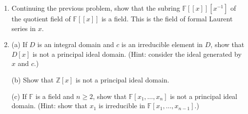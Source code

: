 \documentclass[12pt]{article}
\newcommand{\FF}{{\mathbb F}}
\newcommand{\ZZ}{{\mathbb Z}}
\begin{document}
\begin{enumerate}
\item Continuing the previous problem, show that the subring $\FF[[x]][x^{-1}]$ of the 
      quotient field of $\FF[[x]]$ is a field.
      This is the field of formal Laurent series in $x$.\vspace{-2pt}



       
\item
 (a) If $D$ is an integral domain and $c$ is an irreducible element in $D$, show that $D[x]$ is not a principal ideal domain.
  (Hint: consider the ideal generated by $x$ and $c$.)

  (b) Show that $\ZZ[x]$ is not a principal ideal domain.

  (c) If $\FF$ is a field and $n\geq 2$, show that $\FF[x_1,\dotsc,x_n]$ is not a principal ideal domain.
      (Hint: show that $x_1$ is irreducible in $\FF[x_1,\dotsc,x_{n-1}]$.)
       \vspace{-2pt}

\end{enumerate}
\end{document}
